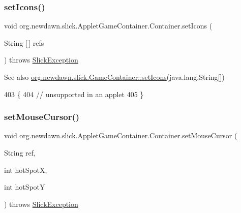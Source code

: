 \subsubsection{\texorpdfstring{set\+Icons()}{setIcons()}}
{\footnotesize\ttfamily void org.\+newdawn.\+slick.\+Applet\+Game\+Container.\+Container.\+set\+Icons (\begin{DoxyParamCaption}\item[{String \mbox{[}$\,$\mbox{]}}]{refs }\end{DoxyParamCaption}) throws \mbox{\hyperlink{classorg_1_1newdawn_1_1slick_1_1_slick_exception}{Slick\+Exception}}\hspace{0.3cm}{\ttfamily [inline]}}

\begin{DoxySeeAlso}{See also}
\mbox{\hyperlink{classorg_1_1newdawn_1_1slick_1_1_game_container_a9be825e4e0980618340296e9cbbededf}{org.\+newdawn.\+slick.\+Game\+Container\+::set\+Icons}}(java.\+lang.\+String\mbox{[}\mbox{]}) 
\end{DoxySeeAlso}

\begin{DoxyCode}
403                                                                 \{
404          \textcolor{comment}{// unsupported in an applet}
405       \}
\end{DoxyCode}
\mbox{\label{classorg_1_1newdawn_1_1slick_1_1_applet_game_container_1_1_container_a84b0d6f06392817caf96cf8f039190cd}} 
\subsubsection{\texorpdfstring{set\+Mouse\+Cursor()}{setMouseCursor()}\hspace{0.1cm}{\footnotesize\ttfamily [1/4]}}
{\footnotesize\ttfamily void org.\+newdawn.\+slick.\+Applet\+Game\+Container.\+Container.\+set\+Mouse\+Cursor (\begin{DoxyParamCaption}\item[{String}]{ref,  }\item[{int}]{hot\+SpotX,  }\item[{int}]{hot\+SpotY }\end{DoxyParamCaption}) throws \mbox{\hyperlink{classorg_1_1newdawn_1_1slick_1_1_slick_exception}{Slick\+Exception}}\hspace{0.3cm}{\ttfamily [inline]}}

